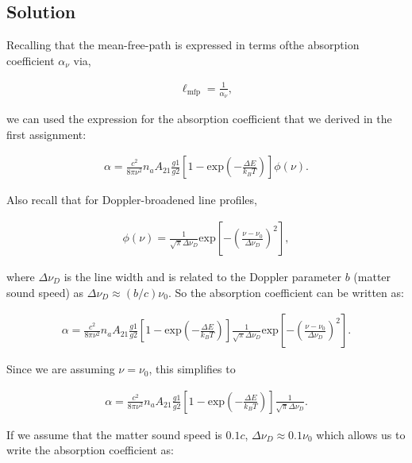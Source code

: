 \documentclass[12pt]{article}
\begin{document}

\subsection*{Solution}

Recalling that the mean-free-path is expressed in terms ofthe absorption coefficient $\alpha_\nu$ via,

\begin{align*}
\ell_\mathrm{mfp} = \frac{1}{\alpha_\nu},
\end{align*}

we can used the expression for the absorption coefficient that we derived in the first assignment:

\begin{align}
\alpha = \frac{c^2}{8\pi\nu^2}n_aA_{21}\frac{g1}{g2}\left[ 1 - \mathrm{exp}\left(-\frac{{\Delta}E}{k_BT}\right)\right]\phi(\nu).
\end{align}

Also recall that for Doppler-broadened line profiles,

\begin{align*}
\phi(\nu) = \frac{1}{\sqrt{\pi}\Delta\nu_D}\mathrm{exp}\left[-\left(\frac{\nu - \nu_0}{\Delta\nu_D}\right)^2\right],
\end{align*}

where $\Delta\nu_D$ is the line width and is related to the Doppler parameter $b$ (matter sound speed) as $\Delta\nu_D \approx (b/c)\nu_0$. So the absorption coefficient can be written as:

\begin{align}
\alpha = \frac{c^2}{8\pi\nu^2}n_aA_{21}\frac{g1}{g2}\left[ 1 - \mathrm{exp}\left(-\frac{{\Delta}E}{k_BT}\right)\right] \frac{1}{\sqrt{\pi}\Delta\nu_D}\mathrm{exp}\left[-\left(\frac{\nu - \nu_0}{\Delta\nu_D}\right)^2\right].
\end{align}

Since we are assuming $\nu=\nu_0$, this simplifies to

\begin{align}
\alpha = \frac{c^2}{8\pi\nu^2}n_aA_{21}\frac{g1}{g2}\left[ 1 - \mathrm{exp}\left(-\frac{{\Delta}E}{k_BT}\right)\right] \frac{1}{\sqrt{\pi}\Delta\nu_D}.
\end{align}

If we assume that the matter sound speed is $0.1c$, $\Delta\nu_D \approx 0.1\nu_0$ which allows us to write the absorption coefficient as:
\end{document}

